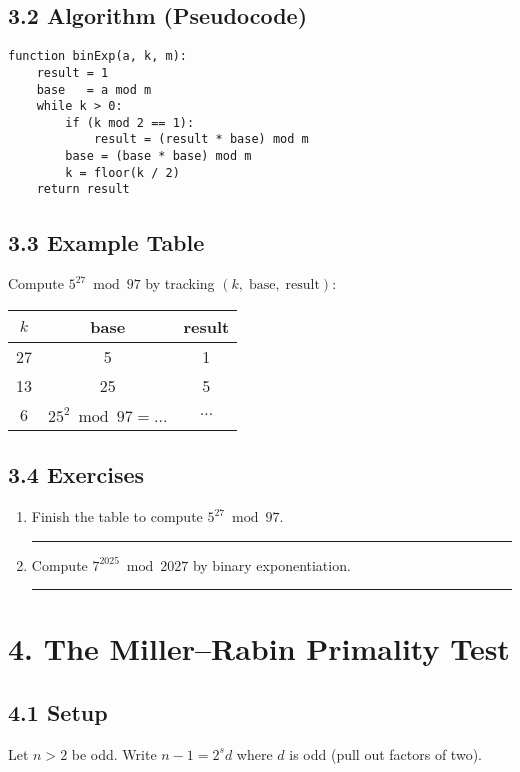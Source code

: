 \documentclass[12pt]{article}
\begin{document}
\subsection{3.2 Algorithm (Pseudocode)}
\begin{verbatim}
function binExp(a, k, m):
    result = 1
    base   = a mod m
    while k > 0:
        if (k mod 2 == 1):
            result = (result * base) mod m
        base = (base * base) mod m
        k = floor(k / 2)
    return result
\end{verbatim}

\subsection{3.3 Example Table}
Compute $5^{27}\bmod97$ by tracking $(k,\;\text{base},\;\text{result})$:
\begin{tabular}{|c|c|c|}
\hline
$k$ & base & result\\
\hline
27 & 5 & 1\\
13 & 25 & 5\\
6  & $25^2 \bmod 97 = \dots$ & $\dots$\\
\hline
\end{tabular}

\subsection{3.4 Exercises}
\begin{enumerate}[label=Exercise 3.\arabic*]
  \item Finish the table to compute $5^{27}\bmod97$.\rule{6cm}{0.4pt}
  \item Compute $7^{2025}\bmod2027$ by binary exponentiation.\rule{6cm}{0.4pt}
\end{enumerate}

\section{4. The Miller--Rabin Primality Test}
\subsection{4.1 Setup}
Let $n>2$ be odd.  Write $n-1=2^s d$ where $d$ is odd (pull out factors of two).
\end{document}
